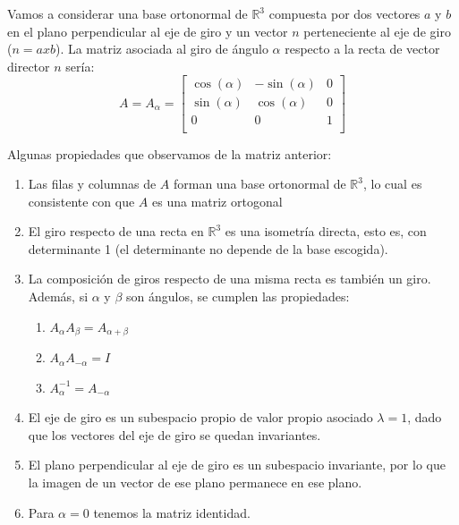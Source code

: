 \documentclass[10pt,a4paper]{article}
\theoremstyle{mystyle}
\begin{document}
Vamos a considerar una base ortonormal de $\mathbb{R}^3$ compuesta por dos vectores $a$ y $b$ en el plano perpendicular al eje de giro y un vector $n$ perteneciente al eje de giro ($n = axb$). La matriz asociada al giro de ángulo $\alpha$ respecto a la recta de vector director $n$ sería:\\

\[
A=A_{\alpha}=
\begin{bmatrix}
\cos(\alpha) & -\sin(\alpha) & 0 \\
\sin(\alpha) &  \cos(\alpha)  & 0 \\
0 & 0 & 1 \\
\end{bmatrix}
\]


Algunas propiedades que observamos de la matriz anterior:\\ 

\begin{enumerate}
	\item 
	Las filas y columnas de $A$ forman una base ortonormal de $\mathbb{R}^3$, lo cual es consistente con que $A$ es una matriz ortogonal
	
	\item
	
	El giro respecto de una recta en $\mathbb{R}^3$ es una isometría directa, esto es, con determinante 1 (el determinante no depende de la base escogida).
	
	\item
	
	La composición de giros respecto de una misma recta es también un giro. Además, si $\alpha$ y $\beta$ son ángulos, se cumplen las propiedades:
	
	\begin{enumerate}
		\item
		$A_{\alpha} A_{\beta} = A_{\alpha+\beta}$
		\item
		$A_{\alpha} A_{-\alpha} = I $
		\item
		$A_{\alpha}^{-1} = A_{-\alpha}$
	\end{enumerate}
	
	\item
	
	El eje de giro es un subespacio propio de valor propio asociado $\lambda = 1$, dado que los vectores del eje de giro se quedan invariantes.
	
	\item
	
	El plano perpendicular al eje de giro es un subespacio invariante, por lo que la imagen de
	un vector de ese plano permanece en ese plano.
	
	\item
	
	Para $\alpha = 0$ tenemos la matriz identidad.
	
\end{enumerate}
\end{document}
